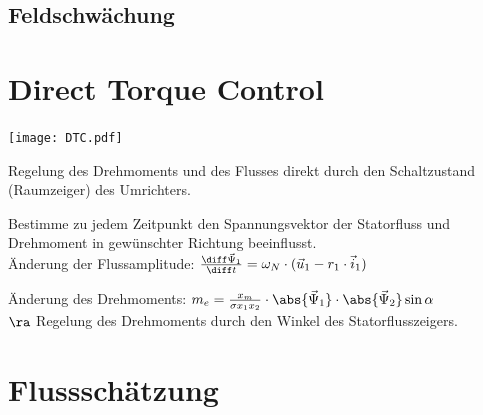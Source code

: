 \documentclass[fs, german]{latex4ei_fs}
\begin{document}
\begin{sectionbox}
\subsection{Feldschwächung}    
\end{sectionbox}
\section{Direct Torque Control} 
\begin{sectionbox}
\texttt{[image: DTC.pdf]}


Regelung des Drehmoments und des Flusses direkt durch den Schaltzustand (Raumzeiger) des Umrichters.

Bestimme zu jedem Zeitpunkt den Spannungsvektor der Statorfluss und Drehmoment in gewünschter Richtung beeinflusst. \\


Änderung der Flussamplitude: $\frac{\diff \vec \Psi_1}{\diff t} = \omega_N \cdot (\vec u_1 - r_1 \cdot \vec i_1)$

Änderung des Drehmoments: $m_e = \frac{x_m}{\sigma x_1 x_2} \cdot \abs{\vec \Psi_1} \cdot \abs{\vec \Psi_2} \sin \alpha$ \\
$\ra $ Regelung des Drehmoments durch den Winkel des Statorflusszeigers.
\end{sectionbox}

\section{Flussschätzung} 
\end{document}
